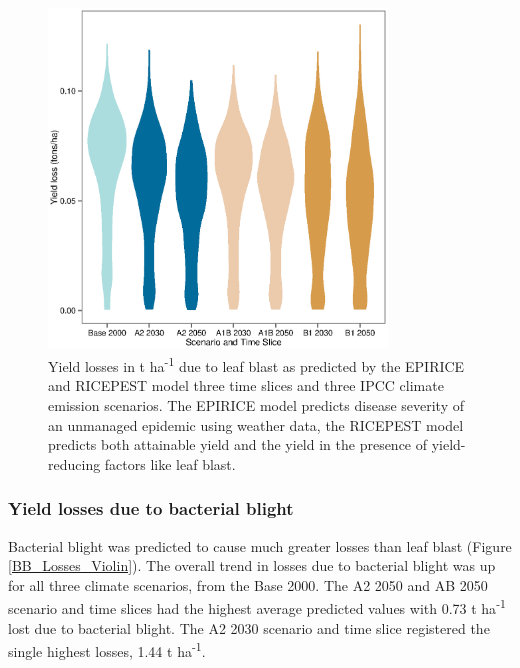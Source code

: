 \documentclass[preprint,review,12pt]{elsarticle}
\begin{document}
    \begin{figure}[H]
      \includegraphics[width = 90mm]{Figures/LB_Losses_Violin}
      \caption{Yield losses in t ha\textsuperscript{-1} due to leaf blast as predicted by the EPIRICE and RICEPEST model three time slices and three IPCC climate emission scenarios. The EPIRICE model predicts disease severity of an unmanaged epidemic using weather data, the RICEPEST model predicts both attainable yield and the yield in the presence of yield-reducing factors like leaf blast.}
      \label{LB_Losses_Violin}
    \end{figure}
    
    \subsubsection{Yield losses due to bacterial blight}
    Bacterial blight was predicted to cause much greater losses than leaf blast (Figure \ref{BB_Losses_Violin}). The overall trend in losses due to bacterial blight was up for all three climate scenarios, from the Base 2000. The A2 2050 and AB 2050 scenario and time slices had the highest average predicted values with 0.73 t ha\textsuperscript{-1} lost due to bacterial blight. The A2 2030 scenario and time slice registered the single highest losses, 1.44 t ha\textsuperscript{-1}.
    
\end{document}
